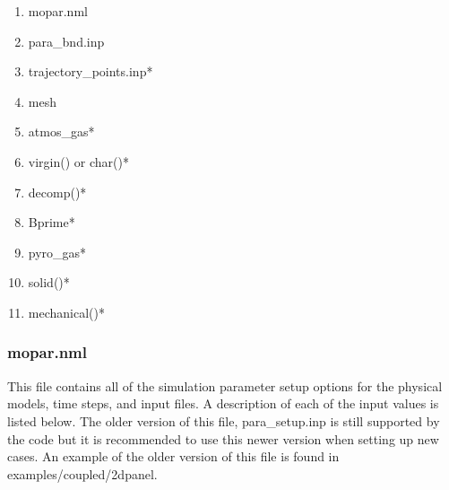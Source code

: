 \documentclass[]{article}
\begin{document}
\begin{enumerate}
 \item mopar.nml
 \item para\_bnd.inp
 \item trajectory\_points.inp*
 \item mesh
 \item atmos\_gas*
 \item virgin() or char()*
 \item decomp()*
 \item Bprime*
 \item pyro\_gas*
 \item solid()*
 \item mechanical()*
\end{enumerate}

\subsubsection{mopar.nml}

This file contains all of the simulation parameter setup options for the physical models, time steps,
and input files. A description of each of the input values is listed below.  The older version of this file, para\_setup.inp is still supported by the code but it is recommended to use this newer version when setting up new cases.  An example of the older version of this file is found in examples/coupled/2dpanel.
\end{document}
